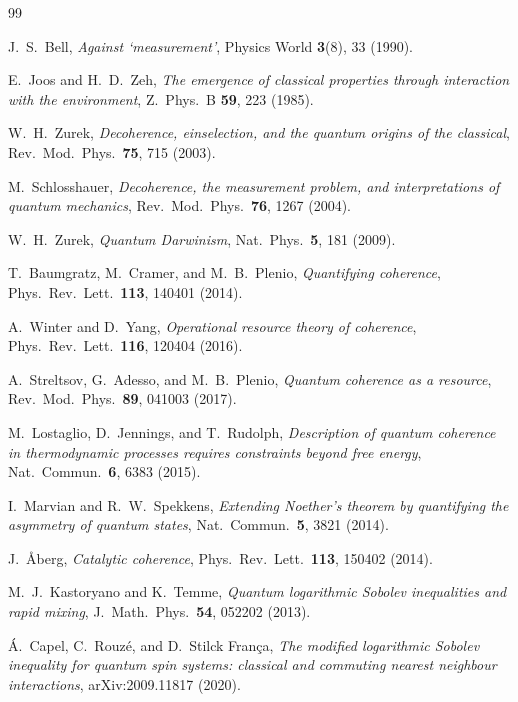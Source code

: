 \documentclass[11pt,a4paper]{article}
\theoremstyle{remark}
\begin{document}
\begin{thebibliography}{99}\small

 J.~S.~Bell, \emph{Against `measurement'}, Physics World \textbf{3}(8), 33 (1990).

 E.~Joos and H.~D.~Zeh, \emph{The emergence of classical properties through interaction with the environment}, Z.~Phys.~B \textbf{59}, 223 (1985).

 W.~H.~Zurek, \emph{Decoherence, einselection, and the quantum origins of the classical}, Rev.~Mod.~Phys.~\textbf{75}, 715 (2003).

 M.~Schlosshauer, \emph{Decoherence, the measurement problem, and interpretations of quantum mechanics}, Rev.~Mod.~Phys.~\textbf{76}, 1267 (2004).

 W.~H.~Zurek, \emph{Quantum Darwinism}, Nat.~Phys.~\textbf{5}, 181 (2009).

 T.~Baumgratz, M.~Cramer, and M.~B.~Plenio, \emph{Quantifying coherence}, Phys.~Rev.~Lett.~\textbf{113}, 140401 (2014).

 A.~Winter and D.~Yang, \emph{Operational resource theory of coherence}, Phys.~Rev.~Lett.~\textbf{116}, 120404 (2016).

 A.~Streltsov, G.~Adesso, and M.~B.~Plenio, \emph{Quantum coherence as a resource}, Rev.~Mod.~Phys.~\textbf{89}, 041003 (2017).

 M.~Lostaglio, D.~Jennings, and T.~Rudolph, \emph{Description of quantum coherence in thermodynamic processes requires constraints beyond free energy}, Nat.~Commun.~\textbf{6}, 6383 (2015).

 I.~Marvian and R.~W.~Spekkens, \emph{Extending Noether's theorem by quantifying the asymmetry of quantum states}, Nat.~Commun.~\textbf{5}, 3821 (2014).

 J.~{\AA}berg, \emph{Catalytic coherence}, Phys.~Rev.~Lett.~\textbf{113}, 150402 (2014).

 M.~J.~Kastoryano and K.~Temme, \emph{Quantum logarithmic Sobolev inequalities and rapid mixing}, J.~Math.~Phys.~\textbf{54}, 052202 (2013).

 \'A.~Capel, C.~Rouz\'e, and D.~Stilck Fran\c{c}a, \emph{The modified logarithmic Sobolev inequality for quantum spin systems: classical and commuting nearest neighbour interactions}, arXiv:2009.11817 (2020).


\end{thebibliography}
\end{document}
